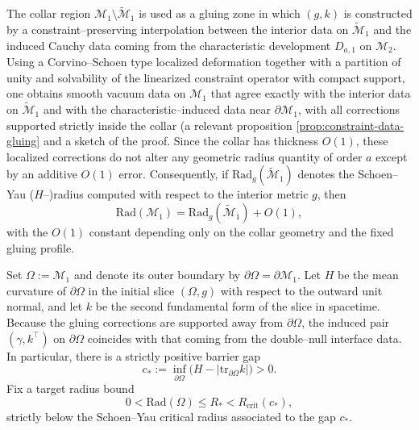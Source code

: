 \documentclass{amsart}
\newcommand{\tr}{\mbox{tr}}
\begin{document}
{\noindent The collar region $\mathcal M_{1}\setminus\widetilde{\mathcal M}_{1}$ is used as a gluing zone in which $(g,k)$ is constructed by a constraint–preserving interpolation between the interior data on $\widetilde{\mathcal M}_{1}$ and the induced Cauchy data coming from the characteristic development $D_{a,1}$ on $\mathcal M_{2}$. Using a Corvino–Schoen type localized deformation together with a partition of unity and solvability of the linearized constraint operator with compact support, one obtains smooth vacuum data on $\mathcal M_{1}$ that agree exactly with the interior data on $\widetilde{\mathcal M}_{1}$ and with the characteristic–induced data near $\partial\mathcal M_{1}$, with all corrections supported strictly inside the collar (a relevant proposition \ref{prop:constraint-data-gluing} and a sketch of the proof. Since the collar has thickness $O(1)$, these localized corrections do not alter any geometric radius quantity of order $a$ except by an additive $O(1)$ error. Consequently, if $\text{Rad}_g(\widetilde{\mathcal M}_{1})$ denotes the Schoen–Yau ($H$–)radius computed with respect to the interior metric $g$, then
\begin{equation}
\text{Rad}(\mathcal M_{1})=\text{Rad}_g(\widetilde{\mathcal M}_{1})+O(1),
\end{equation}
with the $O(1)$ constant depending only on the collar geometry and the fixed gluing profile.






\medskip

\noindent Set $\Omega:=\mathcal M_{1}$ and denote its outer boundary by $\partial\Omega=\partial\mathcal M_{1}$. Let $H$ be the mean curvature of $\partial\Omega$ in the initial slice $(\Omega,g)$ with respect to the outward unit normal, and let $k$ be the second fundamental form of the slice in spacetime. Because the gluing corrections are supported away from $\partial\Omega$, the induced pair $(\gamma,k^\top)$ on $\partial\Omega$ coincides with that coming from the double–null interface data. In particular, there is a strictly positive barrier gap
\begin{equation}\label{eq:Yau-gap-annals}
c_*:=\inf_{\partial\Omega}\Big(H-|\tr_{\partial\Omega}k|\Big)>0.
\end{equation}
Fix a target radius bound
\begin{equation}
0<\text{Rad}(\Omega)\le R_*<R_{\mathrm{crit}}(c_*),
\end{equation}
strictly below the Schoen–Yau critical radius associated to the gap $c_*$.

}
\end{document}
